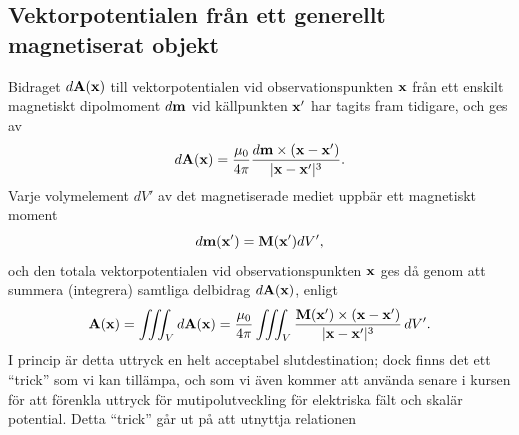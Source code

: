 {{{{{\subsection{Vektorpotentialen fr{\aa}n ett generellt magnetiserat objekt}
\noindent
Bidraget $d{\bf A}({\bf x})$ till vektorpotentialen vid observationspunkten
${\bf x}$ fr{\aa}n ett enskilt magnetiskt dipolmoment $d{\bf m}$ vid
k{\"a}llpunkten ${\bf x}'$ har tagits fram tidigare, och ges
av
$$
  d{\bf A}({\bf x})={{\mu_0}\over{4\pi}}
     {{d{\bf m}\times({\bf x}-{\bf x}')}\over{|{\bf x}-{\bf x}'|^3}}.
$$
Varje volymelement $dV'$ av det magnetiserade mediet uppb{\"a}r ett magnetiskt
moment
$$
  d{\bf m}({\bf x}')={\bf M}({\bf x}')dV',
$$
och den totala vektorpotentialen vid observationspunkten ${\bf x}$ ges d{\aa}
genom att summera (integrera) samtliga delbidrag $d{\bf A}({\bf x})$, enligt
$$
  {\bf A}({\bf x}) = \iiint_V d{\bf A}({\bf x})
  ={{\mu_0}\over{4\pi}}
     \iiint_V{{{\bf M}({\bf x}')\times({\bf x}-{\bf x}')}
                       \over{|{\bf x}-{\bf x}'|^3}}\,dV'.
$$
I princip {\"a}r detta uttryck en helt acceptabel slutdestination; dock finns
det ett ``trick'' som vi kan till{\"a}mpa, och som vi {\"a}ven kommer att
anv{\"a}nda senare i kursen f{\"o}r att f{\"o}renkla uttryck f{\"o}r
mutipolutveckling f{\"o}r elektriska f{\"a}lt och skal{\"a}r potential.
Detta ``trick'' g{\aa}r ut p{\aa} att utnyttja relationen}}}}}
